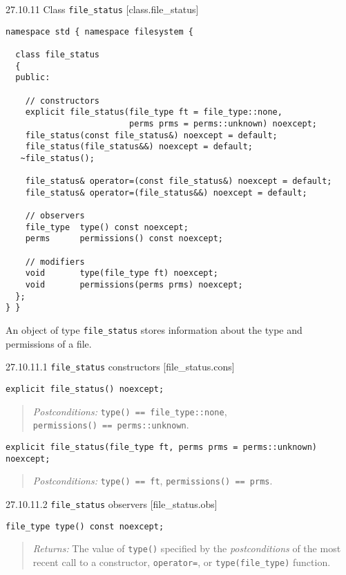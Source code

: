 27.10.11 Class \texttt{file\_status} {[}class.file\_status{]}

\begin{verbatim}
namespace std { namespace filesystem {

  class file_status
  {
  public:

    // constructors
    explicit file_status(file_type ft = file_type::none,
                         perms prms = perms::unknown) noexcept;
    file_status(const file_status&) noexcept = default;
    file_status(file_status&&) noexcept = default;
   ~file_status();

    file_status& operator=(const file_status&) noexcept = default;
    file_status& operator=(file_status&&) noexcept = default;

    // observers
    file_type  type() const noexcept;
    perms      permissions() const noexcept;

    // modifiers
    void       type(file_type ft) noexcept;
    void       permissions(perms prms) noexcept;
  };
} }
\end{verbatim}

An object of type \texttt{file\_status} stores information about the
type and permissions of a file.

27.10.11.1 \texttt{file\_status} constructors {[}file\_status.cons{]}

\begin{verbatim}
explicit file_status() noexcept;
\end{verbatim}

\begin{quote}
\emph{Postconditions:} \texttt{type()\ ==\ file\_type::none},
\texttt{permissions()\ ==\ perms::unknown}.
\end{quote}

\begin{verbatim}
explicit file_status(file_type ft, perms prms = perms::unknown) noexcept;
\end{verbatim}

\begin{quote}
\emph{Postconditions:} \texttt{type()\ ==\ ft},
\texttt{permissions()\ ==\ prms}.
\end{quote}

27.10.11.2 \texttt{file\_status} observers {[}file\_status.obs{]}

\begin{verbatim}
file_type type() const noexcept;
\end{verbatim}

\begin{quote}
\emph{Returns:} The value of \texttt{type()} specified by the
\emph{postconditions} of the most recent call to a constructor,
\texttt{operator=}, or \texttt{type(file\_type)} function.
\end{quote}

